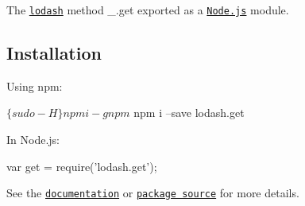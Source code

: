 The \href{https://lodash.com/}{\tt lodash} method {\ttfamily \+\_\+.\+get} exported as a \href{https://nodejs.org/}{\tt Node.\+js} module.

\subsection*{Installation}

Using npm\+: 
\begin{DoxyCode}
$ \{sudo -H\} npm i -g npm
$ npm i --save lodash.get
\end{DoxyCode}


In Node.\+js\+: 
\begin{DoxyCode}
var get = require('lodash.get');
\end{DoxyCode}


See the \href{https://lodash.com/docs#get}{\tt documentation} or \href{https://github.com/lodash/lodash/blob/4.4.2-npm-packages/lodash.get}{\tt package source} for more details. 